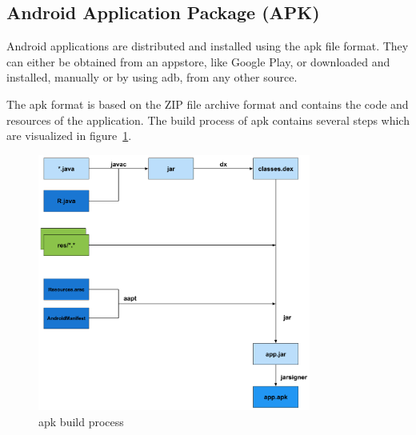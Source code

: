 \subsection{Android Application Package (APK)} \label{subsection:foundation-android-package}
Android applications are distributed and installed using the \gls{apk} file format.
They can either be obtained from an appstore, like Google Play, or downloaded and installed, manually or by using \gls{adb}, from any other source.

The \gls{apk} format is based on the ZIP file archive format and contains the code and resources of the application.
The build process of \gls{apk} contains several steps which are visualized in figure~\ref{fig:apk}.
\newline

\begin{figure}[h]
    \centering
    \includegraphics[width=0.8\textwidth]{data/apk.png}
    \caption{\gls{apk} build process \cite{andevconDalvikART}}
    \label{fig:apk}
\end{figure}

